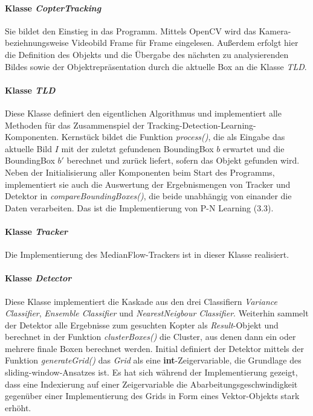 \paragraph{Klasse \textit{CopterTracking}}
Sie bildet den Einstieg in das Programm. Mittels OpenCV wird das Kamera- beziehnungsweise Videobild Frame für Frame eingelesen. Außerdem erfolgt hier die Definition des Objekts und die Übergabe des nächsten zu analysierenden Bildes sowie der Objektrepräsentation durch die aktuelle Box an die Klasse \textit{TLD}.

\paragraph{Klasse \textit{TLD}}
Diese Klasse definiert den eigentlichen Algorithmus und implementiert alle Methoden für das Zusammenspiel der Tracking-Detection-Learning-Komponenten. Kernstück bildet die Funktion \textit{process()}, die als Eingabe das aktuelle Bild $I$ mit der zuletzt gefundenen BoundingBox $b$ erwartet und die BoundingBox $b'$ berechnet und zurück liefert, sofern das Objekt gefunden wird. Neben der Initialisierung aller Komponenten beim Start des Programms, implementiert sie auch die Auswertung der Ergebnismengen von Tracker und Detektor in \textit{compareBoundingBoxes()}, die beide unabhängig von einander die Daten verarbeiten. Das ist die Implementierung von P-N Learning (3.3).

\paragraph{Klasse \textit{Tracker}}
Die Implementierung des MedianFlow-Trackers ist in dieser Klasse realisiert.

\paragraph{Klasse \textit{Detector}}
Diese Klasse implementiert die Kaskade aus den drei Classifiern \textit{Variance Classifier}, \textit{Ensemble Classifier} und \textit{NearestNeigbour Classifier}. Weiterhin sammelt der Detektor alle Ergebnisse zum gesuchten Kopter als \textit{Result}-Objekt und berechnet in der Funktion \textit{clusterBoxes()} die Cluster, aus denen dann ein oder mehrere finale Boxen berechnet werden. Initial definiert der Detektor mittels der Funktion \textit{generateGrid()} das \textit{Grid} als eine \textbf{int}-Zeigervariable, die Grundlage des sliding-window-Ansatzes ist. Es hat sich während der Implementierung gezeigt, dass eine Indexierung auf einer Zeigervariable die Abarbeitungsgeschwindigkeit gegenüber einer Implementierung des Grids in Form eines Vektor-Objekts stark erhöht.

